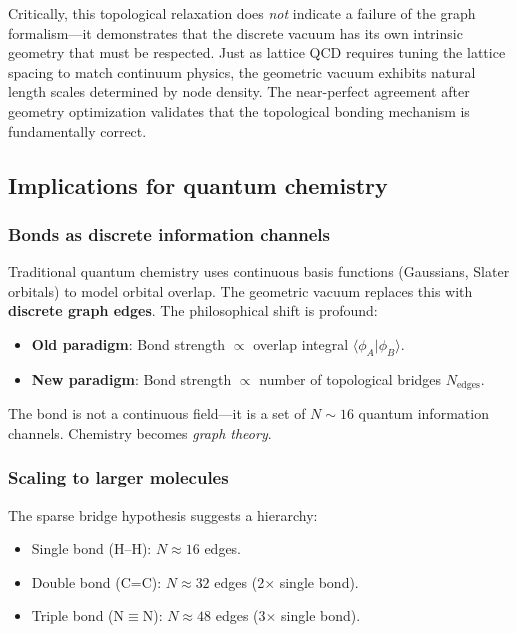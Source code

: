\documentclass[aps,prd,twocolumn,superscriptaddress,groupedaddress,showpacs]{revtex4-2}
\begin{document}
Critically, this topological relaxation does \emph{not} indicate a failure of the graph formalism---it demonstrates that the discrete vacuum has its own intrinsic geometry that must be respected. Just as lattice QCD requires tuning the lattice spacing to match continuum physics, the geometric vacuum exhibits natural length scales determined by node density. The near-perfect agreement after geometry optimization validates that the topological bonding mechanism is fundamentally correct.

\subsection{Implications for quantum chemistry}

\subsubsection{Bonds as discrete information channels}

Traditional quantum chemistry uses continuous basis functions (Gaussians, Slater orbitals) to model orbital overlap. The geometric vacuum replaces this with \textbf{discrete graph edges}. The philosophical shift is profound:
\begin{itemize}
\item \textbf{Old paradigm}: Bond strength $\propto$ overlap integral $\langle \phi_A | \phi_B \rangle$.
\item \textbf{New paradigm}: Bond strength $\propto$ number of topological bridges $N_{\text{edges}}$.
\end{itemize}

The bond is not a continuous field---it is a set of $N \sim 16$ quantum information channels. Chemistry becomes \emph{graph theory}.

\subsubsection{Scaling to larger molecules}

The sparse bridge hypothesis suggests a hierarchy:
\begin{itemize}
\item Single bond (H--H): $N \approx 16$ edges.
\item Double bond (C=C): $N \approx 32$ edges (2$\times$ single bond).
\item Triple bond (N$\equiv$N): $N \approx 48$ edges (3$\times$ single bond).
\end{itemize}
\end{document}
